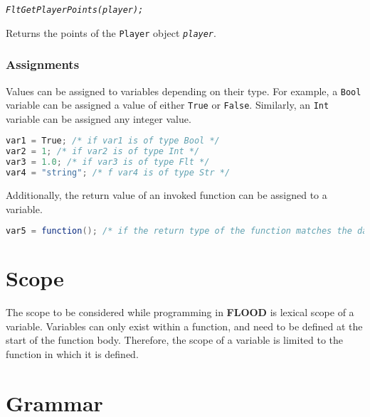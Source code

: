 \documentclass[12pt]{report}
\begin{document}
\begin{alltt}\begin{singlespace}
            \textit{Flt GetPlayerPoints(player);}\end{singlespace}
\end{alltt}

Returns the points of the \texttt{Player} object \textit{\texttt{player}}.

\subsubsection{Assignments}

Values can be assigned to variables depending on their type. For example,  a \texttt{Bool} variable can be assigned a value of either \texttt{True} or \texttt{False}. Similarly, an \texttt{Int} variable can be assigned any integer value. 

\begin{singlespace}
\begin{lstlisting}[language=Java,label=some-code,caption=Assignments]
var1 = True; /* if var1 is of type Bool */
var2 = 1; /* if var2 is of type Int */
var3 = 1.0; /* if var3 is of type Flt */
var4 = "string"; /* f var4 is of type Str */
\end{lstlisting}
\end{singlespace}

Additionally, the return value of an invoked function can be assigned to a variable.

\begin{singlespace}
\begin{lstlisting}[language=Java,label=some-code,caption=Function assignment]
var5 = function(); /* if the return type of the function matches the data type of var5 */
\end{lstlisting}
\end{singlespace}

\section{Scope}

The scope to be considered while programming in \textbf{FLOOD} is lexical scope of a variable. Variables can only exist within a function, and need to be defined at the start of the function body. Therefore, the scope of a variable is limited to the function in which it is defined.

\section{Grammar}
\end{document}
